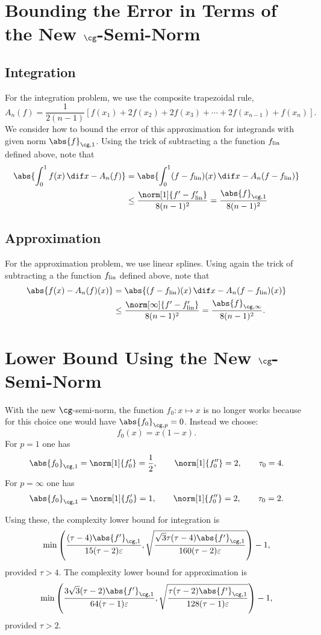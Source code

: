 \documentclass[final]{elsarticle}
\newcommand{\flin}{f_{\text{\rm{lin}}}}
\newcommand{\Gnorm}[2]{\abs{#2}_{\cg,#1}}
\theoremstyle{definition}
\theoremstyle{remark}
\begin{document}
\section{Bounding the Error in Terms of the New $\cg$-Semi-Norm}
\subsection{Integration}

For the integration problem, we use the composite trapezoidal rule, 
\begin{equation*}
A_n(f) = \frac{1}{2(n-1)} \left[f(x_{1}) + 2f(x_{2}) + 2f(x_{3}) + \cdots
 + 2f(x_{n-1}) + f(x_{n})\right].
\end{equation*}
We consider how to bound the error of this approximation for integrands with given norm $\Gnorm{1}{f}$.  Using the trick of subtracting a the function $\flin$ defined above, note that
\begin{align*}
\abs{\int_0^1 f(x) \, \dif x - A_n(f)}
 & = \abs{\int_0^1 (f-\flin)(x) \, \dif x - A_n(f-\flin)} \\
& \le \frac{\norm[1]{f'-\flin'}}{8(n-1)^2}= \frac{\Gnorm{1}{f}}{8(n-1)^2}\\
\end{align*}

\subsection{Approximation}

For the approximation problem, we use linear splines.  Using again the trick of subtracting a the function $\flin$ defined above, note that
\begin{align*}
\abs{f(x) - A_n(f)(x)}
 & = \abs{(f-\flin)(x) \, \dif x - A_n(f-\flin)(x)} \\
& \le \frac{\norm[\infty]{f'-\flin'}}{8(n-1)^2}= \frac{\Gnorm{\infty}{f}}{8(n-1)^2}.
\end{align*}


\section{Lower Bound Using the New $\cg$-Semi-Norm}
With the new $\cg$-semi-norm, the function $f_0:x \mapsto x$ is no longer works because for this choice one would have $\Gnorm{p}{f_0}=0$.  Instead we choose:
\[
f_0(x) = x(1-x).
\]
For $p=1$ one has 
\[
\Gnorm{1}{f_0}=\norm[1]{f_0'}=\frac 12, \qquad \norm[1]{f_0''}=2, \qquad \tau_0=4.
\]
For $p=\infty$ one has 
\[
\Gnorm{1}{f_0}=\norm[1]{f_0'}=1, \qquad \norm[1]{f_0''}=2, \qquad \tau_0=2.
\]

Using these, the complexity lower bound for integration is
\[
\min\left(\frac{(\tau-4)\Gnorm{1}{f'}}{15(\tau-2) \varepsilon}, \sqrt{\frac{\sqrt{3}\tau(\tau-4)\Gnorm{1}{f'}}{160(\tau-2)\varepsilon}} \right)-1, 
\]
provided $\tau>4$.  The complexity lower bound for approximation is
\[
\min\left(\frac{3\sqrt{3}(\tau-2)\Gnorm{1}{f'}}{64(\tau-1) \varepsilon}, \sqrt{\frac{\tau(\tau-2)\Gnorm{1}{f'}}{128(\tau-1)\varepsilon}} \right)-1, 
\]
provided $\tau>2$.




\end{document}

